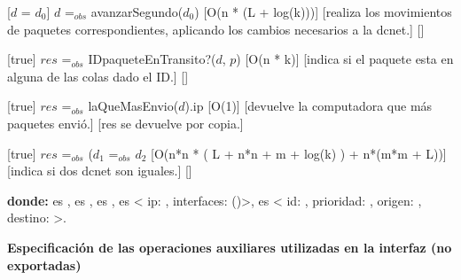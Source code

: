 \begin{Interfaz}
  [$d$ = $d_0$]
  {$d$ =$_{obs}$ avanzarSegundo($d_0$)}%
  [O(n * (L + log(k)))]
  [realiza los movimientos de paquetes correspondientes, aplicando los cambios necesarios a la dcnet.]
  []
  
  [true]
  {$res$ =$_{obs}$ IDpaqueteEnTransito?($d$, $p$)}%
  [O(n * k)]
  [indica si el paquete esta en alguna de las colas dado el ID.]
  []
  
  [true]
  {$res$ =$_{obs}$ laQueMasEnvio($d$).ip}%
  [O(1)]
  [devuelve la computadora que m\'as paquetes envi\'o.]
  [res se devuelve por copia.]  
  
  [true]
  {$res$ =$_{obs}$ ($d_1$ =$_{obs}$ $d_2$}%
  [O(n*n * ( L + n*n + m + log(k) ) + n*(m*m + L))]
  [indica si dos dcnet son iguales.]
  []  
  
  \textbf{donde:} \newline  
    es , \newline
    es , \newline
    es , \newline
    es < ip: , interfaces: ()>, \newline
    es < id: , prioridad: , origen: , destino:  >.
   
\end{Interfaz}

\newpage

\textbf{Especificaci\'on de las operaciones auxiliares utilizadas en la interfaz (no exportadas)}


